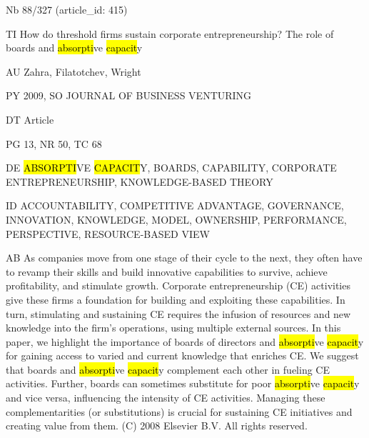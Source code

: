 \documentclass[a4paper]{article}
\begin{document}
\vspace*{-2cm}
Nb \tabto{0cm}88/327 (article\_id: 415)\par
TI \tabto{0cm}How do threshold firms sustain corporate entrepreneurship? The role of boards and \hl{absorpti}ve \hl{capacit}y\par
AU \tabto{0cm}Zahra, Filatotchev, Wright\par
PY \tabto{0cm}2009, SO JOURNAL OF BUSINESS VENTURING\par
DT \tabto{0cm}Article\par
PG \tabto{0cm}13, NR 50, TC 68\par
DE \tabto{0cm}\hl{ABSORPTI}VE \hl{CAPACIT}Y, BOARDS, CAPABILITY, CORPORATE ENTREPRENEURSHIP, KNOWLEDGE-BASED THEORY\par
ID \tabto{0cm}ACCOUNTABILITY, COMPETITIVE ADVANTAGE, GOVERNANCE, INNOVATION, KNOWLEDGE, MODEL, OWNERSHIP, PERFORMANCE, PERSPECTIVE, RESOURCE-BASED VIEW\par
AB \tabto{0cm}As companies move from one stage of their cycle to the next, they often have to revamp their skills and build innovative capabilities to survive, achieve profitability, and stimulate growth. Corporate entrepreneurship (CE) activities give these firms a foundation for building and exploiting these capabilities. In turn, stimulating and sustaining CE requires the infusion of resources and new knowledge into the firm's operations, using multiple external sources. In this paper, we highlight the importance of boards of directors and \hl{absorpti}ve \hl{capacit}y for gaining access to varied and current knowledge that enriches CE. We suggest that boards and \hl{absorpti}ve \hl{capacit}y complement each other in fueling CE activities. Further, boards can sometimes substitute for poor \hl{absorpti}ve \hl{capacit}y and vice versa, influencing the intensity of CE activities. Managing these complementarities (or substitutions) is crucial for sustaining CE initiatives and creating value from them. (C) 2008 Elsevier B.V. All rights reserved.\par
\clearpage
\end{document}
